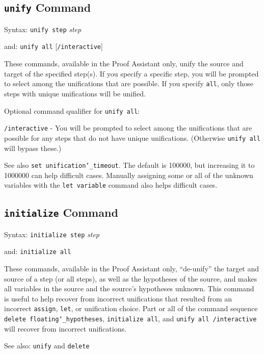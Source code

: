 \subsection{\texttt{unify} Command}
Syntax:  \texttt{unify step} {\em step}

      and:   \texttt{unify all} [\texttt{/interactive}]

These commands, available in the Proof Assistant only, unify the source
and target of the specified step(s). If you specify a specific step, you
will be prompted to select among the unifications that are possible.  If
you specify \texttt{all}, only those steps with unique unifications will be
unified.

Optional command qualifier for \texttt{unify all}:

    \texttt{/interactive} - You will be prompted to select among the
        unifications
        that are possible for any steps that do not have unique
        unifications.  (Otherwise \texttt{unify all} will bypass these.)

See also \texttt{set unification{\char`\_}timeout}.  The default is
100000, but increasing it to 1000000 can help difficult cases.  Manually
assigning some or all of the unknown variables with the \texttt{let
variable} command also helps difficult cases.



\subsection{\texttt{initialize} Command}
Syntax:  \texttt{initialize step} {\em step}

    and: \texttt{initialize all}

These commands, available in the Proof Assistant
only, ``de-unify'' the target and source of a step (or all steps), as
well as the hypotheses of the source, and makes all variables in the
source and the source's hypotheses unknown.  This command is useful to
help recover from incorrect unifications that resulted from an incorrect
\texttt{assign}, \texttt{let}, or unification choice.  Part or all of
the command sequence \texttt{delete floating{\char`\_}hypotheses},
\texttt{initialize all}, and \texttt{unify all /interactive} will recover
from incorrect unifications.

See also:  \texttt{unify} and \texttt{delete}



